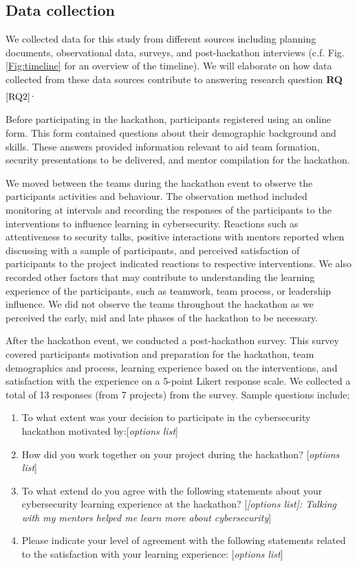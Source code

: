 \documentclass[runningheads]{llncs}
\newcommand{\hr}[1]{\textbf{RQ}$_{\ref{#1}}$}
\begin{document}
\subsection{Data collection}
We collected data for this study from different sources including planning documents, observational data, surveys, and post-hackathon interviews (c.f. Fig. \ref{Fig:timeline} for an overview of the timeline). We will elaborate on how data collected from these data sources contribute to answering research question \hr{RQ2}.

Before participating in the hackathon, participants registered using an online form. This form contained questions about their demographic background and skills. These answers provided information relevant to aid team formation, security presentations to be delivered, and mentor compilation for the hackathon.

We moved between the teams during the hackathon event to observe the participants activities and behaviour. The observation method included monitoring at intervals and recording the responses of the participants to the interventions to influence learning in cybersecurity. Reactions such as attentiveness to security talks, positive interactions with mentors reported when discussing with a sample of participants, and perceived satisfaction of participants to the project indicated reactions to respective interventions. We also recorded other factors that may contribute to understanding the learning experience of the participants, such as teamwork, team process, or leadership influence.
We did not observe the teams throughout the hackathon as we perceived the early, mid and late phases of the hackathon to be necessary.

After the hackathon event, we conducted a post-hackathon survey. This survey covered participants motivation and preparation for the hackathon, team demographics and process, learning experience based on the interventions, and satisfaction with the experience on a 5-point Likert response scale. We collected a total of 13 responses (from 7 projects) from the survey. Sample questions include; 
\begin{enumerate}
    \item To what extent was your decision to participate in the cybersecurity hackathon motivated by:[\textit{options list}]
    \item How did you work together on your project during the hackathon? [\textit{options list}]
    \item To what extend do you agree with the following statements about your cybersecurity learning experience at the hackathon? [\textit{[options list]: Talking with my mentors helped me learn more about cybersecurity}]
    \item Please indicate your level of agreement with the following statements related to the satisfaction with your learning experience: [\textit{options list}]
\end{enumerate}
\end{document}

